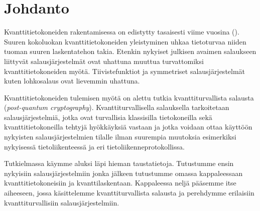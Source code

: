 \chapter{Johdanto\label{intro}}
Kvanttitietokoneiden rakentamisessa on edistytty tasaisesti viime vuosina (\cite{alagic2020status}). Suuren kokoluokan kvanttitietokoneiden yleistyminen uhkaa tietoturvaa niiden tuoman suuren laskentatehon takia. Etenkin nykyiset julkisen avaimen salaukseen liittyvät salausjärjestelmät ovat uhattuna muuttua turvattomiksi kvanttitietokoneiden myötä. Tiivistefunktiot ja symmetriset salausjärjestelmät kuten lohkosalaus ovat lievemmin uhattuna.

Kvanttitietokoneiden tulemisen myötä on alettu tutkia kvanttiturvallista salausta (\emph{post-quantum cryptography}). Kvanttiturvallisella salauksella tarkoitetaan salausjärjestelmiä, jotka ovat turvallisia klassisilla tietokoneilla sekä kvanttitietokoneilla tehtyjä hyökkäyksiä vastaan ja jotka voidaan ottaa käyttöön nykyisten salausjärjestelmien tilalle ilman suurempia muutoksia esimerkiksi nykyisessä tietoliikenteessä ja eri tietoliikenneprotokollissa.

Tutkielmassa käymme aluksi läpi hieman taustatietoja. Tutustumme ensin nykyisiin salausjärjestelmiin jonka jälkeen tutustumme omassa kappaleessaan kvanttitietokoneisiin ja kvanttilaskentaan. Kappaleessa neljä pääsemme itse aiheeseen, jossa käsittelemme kvanttiturvallista salausta ja perehdymme erilaisiin kvanttiturvallisiin salausjärjestelmiin.